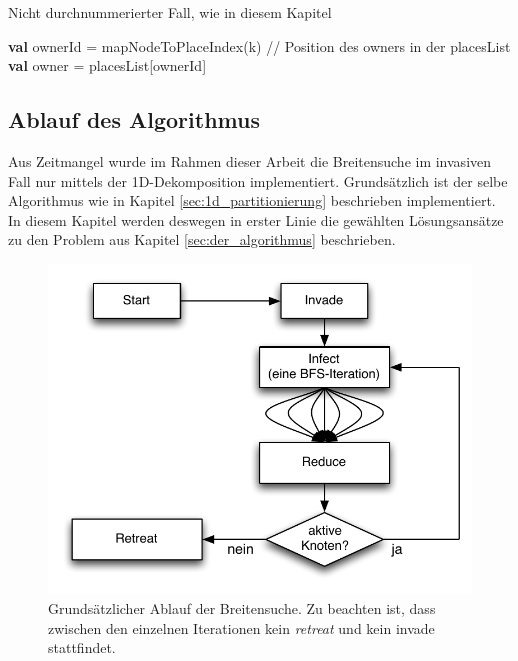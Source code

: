 \begin{algorithm}
	\caption{Nicht durchnummerierter Fall, wie in diesem Kapitel}
	\label{alg:owner_random}
	\begin{algorithmic}[1]
		\State \textbf{val} ownerId = mapNodeToPlaceIndex(k) // Position des owners in der placesList
		\State \textbf{val} owner   = placesList[ownerId]
	\end{algorithmic}
\end{algorithm}

\subsection{Ablauf des Algorithmus} %
\label{sub:ablauf_des_algorithmus}
Aus Zeitmangel wurde im Rahmen dieser Arbeit die Breitensuche im invasiven Fall nur mittels der 1D-Dekomposition implementiert. Grundsätzlich ist der selbe Algorithmus wie in Kapitel \ref{sec:1d_partitionierung} beschrieben implementiert. In diesem Kapitel werden deswegen in erster Linie die gewählten Lösungsansätze zu den Problem aus Kapitel \ref{sec:der_algorithmus} beschrieben.
\begin{figure}[ht]
	\centering
	\label{img:invasive-flow}
	\includegraphics{pics/invasive-flow.pdf}
	\caption{Grundsätzlicher Ablauf der Breitensuche. Zu beachten ist, dass zwischen den einzelnen Iterationen kein \textit{retreat} und kein invade stattfindet.}
\end{figure}

